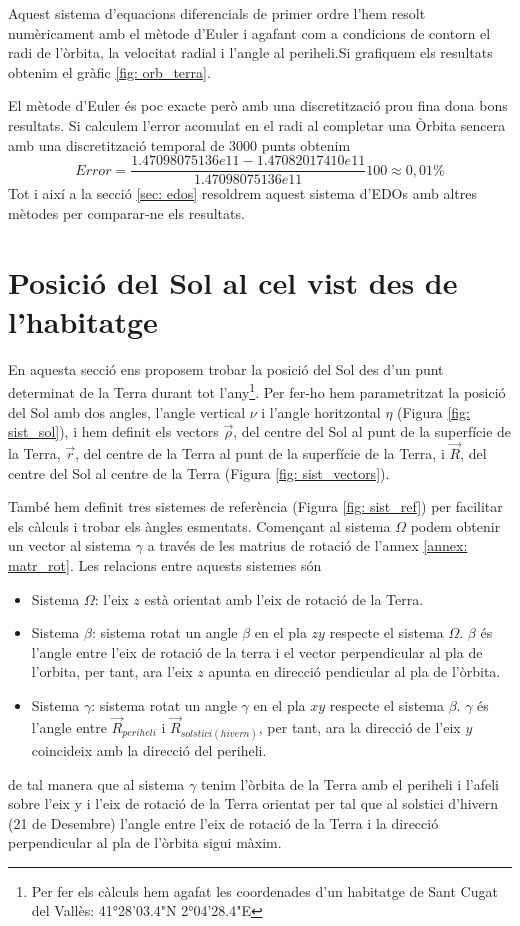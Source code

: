 \documentclass[11pt]{article}
\begin{document}
Aquest sistema d'equacions diferencials de primer ordre l'hem resolt numèricament amb el mètode d'Euler i agafant com a condicions de contorn el radi de l'òrbita, la velocitat radial i l'angle al periheli.\footnotemark[\value{footnote}]
Si grafiquem els resultats obtenim el gràfic \ref{fig: orb_terra}.

El mètode d'Euler és poc exacte però amb una discretització prou fina dona bons resultats. Si calculem l'error acomulat en el radi al completar una Òrbita sencera amb una discretització temporal de $3000$ punts obtenim
\begin{equation}
    Error = \frac{1.47098075136e11-1.47082017410e11}{1.47098075136e11}100\approx0,01\%
\end{equation}
Tot i així a la secció \ref{sec: edos} resoldrem aquest sistema d'EDOs amb altres mètodes per comparar-ne els resultats.


\section{Posició del Sol al cel vist des de l'habitatge} \label{sec: seccio_2}
En aquesta secció ens proposem trobar la posició del Sol des d'un punt determinat de la Terra durant tot l'any\footnote{\label{nota: habitatge}Per fer els càlculs hem agafat les coordenades d'un habitatge de Sant Cugat del Vallès: 41°28'03.4"N 2°04'28.4"E}. Per fer-ho hem parametritzat la posició del Sol amb dos angles, l'angle vertical $\nu$ i l'angle horitzontal $\eta$ (Figura \ref{fig: sist_sol}), i hem definit els vectors $\vec{\rho}$, del centre del Sol al punt de la superfície de la Terra, $\vec{r}$, del centre de la Terra al punt de la superfície de la Terra, i $\vec{R}$, del centre del Sol al centre de la Terra (Figura \ref{fig: sist_vectors}).

També hem definit tres sistemes de referència (Figura \ref{fig: sist_ref}) per facilitar els càlculs i trobar els àngles esmentats. Començant al sistema $\Omega$ podem obtenir un vector al sistema $\gamma$ a través de les matrius de rotació de l'annex \ref{annex: matr_rot}. Les relacions entre aquests sistemes són
\begin{itemize}
    \item Sistema $\Omega$: l'eix $z$ està orientat amb l'eix de rotació de la Terra.
    \item Sistema $\beta$: sistema rotat un angle $\beta$ en el pla $zy$ respecte el sistema $\Omega$. $\beta$ és l'angle entre l'eix de rotació de la terra i el vector perpendicular al pla de l'orbita, per tant, ara l'eix $z$ apunta en direcció pendicular al pla de l'òrbita.
    \item Sistema $\gamma$: sistema rotat un angle $\gamma$ en el pla $xy$ respecte el sistema $\beta$. $\gamma$ és l'angle entre $\vec{R}_{periheli}$ i $\vec{R}_{solstici(hivern)}$, per tant, ara la direcció de l'eix $y$ coincideix amb la direcció del periheli.
\end{itemize}
de tal manera que al sistema $\gamma$ tenim l'òrbita de la Terra amb el periheli i l'afeli sobre l'eix y i l'eix de rotació de la Terra orientat per tal que al solstici d'hivern (21 de Desembre) l'angle entre l'eix de rotació de la Terra i la direcció perpendicular al pla de l'òrbita sigui màxim.
\end{document}
